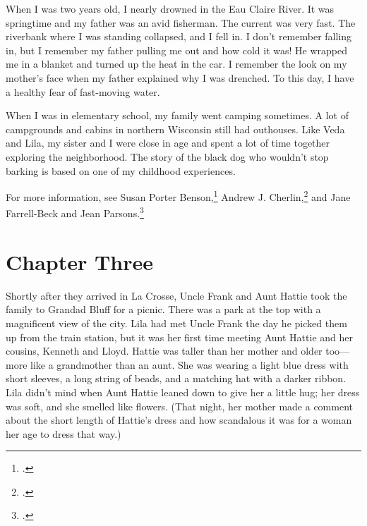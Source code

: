 \documentclass[
  american,
  letterpaper,
]{book}
\begin{document}
When I was two years old, I nearly drowned in the Eau Claire River. It
was springtime and my father was an avid fisherman. The current was very
fast. The riverbank where I was standing collapsed, and I fell in. I
don't remember falling in, but I remember my father pulling me out and
how cold it was! He wrapped me in a blanket and turned up the heat in
the car. I remember the look on my mother's face when my father
explained why I was drenched. To this day, I have a healthy fear of
fast-moving water.

When I was in elementary school, my family went camping sometimes. A lot
of campgrounds and cabins in northern Wisconsin still had outhouses.
Like Veda and Lila, my sister and I were close in age and spent a lot of
time together exploring the neighborhood. The story of the black dog who
wouldn't stop barking is based on one of my childhood experiences.

For more information, see Susan Porter Benson,\footnote{.} Andrew J.
Cherlin,\footnote{.} and Jane Farrell-Beck and Jean
Parsons.\footnote{.}


\chapter{Chapter Three}\label{chapter-three}

Shortly after they arrived in La Crosse, Uncle Frank and Aunt Hattie
took the family to Grandad Bluff for a picnic. There was a park at the
top with a magnificent view of the city. Lila had met Uncle Frank the
day he picked them up from the train station, but it was her first time
meeting Aunt Hattie and her cousins, Kenneth and Lloyd. Hattie was
taller than her mother and older too---more like a grandmother than an
aunt. She was wearing a light blue dress with short sleeves, a long
string of beads, and a matching hat with a darker ribbon. Lila didn't
mind when Aunt Hattie leaned down to give her a little hug; her dress
was soft, and she smelled like flowers. (That night, her mother made a
comment about the short length of Hattie's dress and how scandalous it
was for a woman her age to dress that way.)
\end{document}
